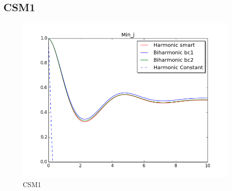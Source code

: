 \subsection*{CSM1}
\begin{figure}[H]
\label{fig:fluid_structure}
\caption{CSM1}
\includegraphics[scale=0.60, trim={0mm 0mm 0mm 0mm},clip]{./Verification_Validation/Mesh_motion_results/CSM1.png}
\end{figure}

